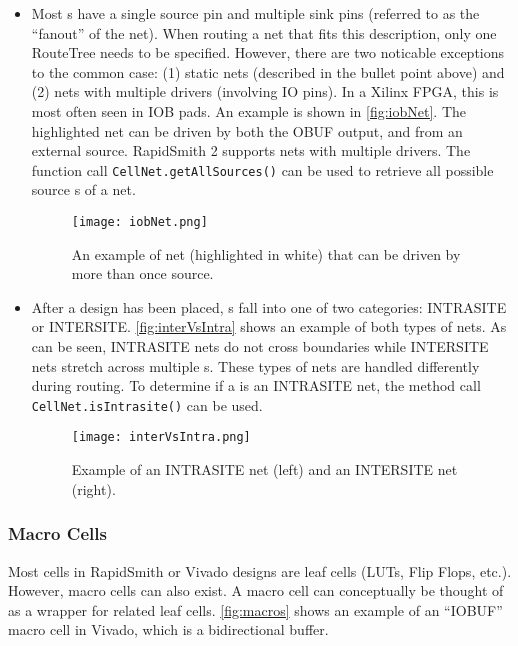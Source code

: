 \begin{itemize}
  \item Most s have a single source pin and multiple sink pins
  (referred to as the ``fanout'' of the net). When routing a net that fits
  this description, only one RouteTree needs to be specified. However, there are
  two noticable exceptions to the common case: (1) static nets (described
  in the bullet point above) and (2) nets with multiple drivers (involving IO
  pins). In a Xilinx FPGA, this is most often seen in IOB pads. An example is
  shown in \autoref{fig:iobNet}. The highlighted net can be driven by both the OBUF output, and from an
  external source. RapidSmith 2 supports nets with multiple drivers. The
  function call \texttt{CellNet.getAllSources()} can be used to retrieve all
  possible source s of a net.
  
  \begin{figure}[H]
   \centering
   \texttt{[image: iobNet.png]}
   \caption{An example of net (highlighted in white) that can be driven by more
   than once source.}
   \label{fig:iobNet}
  \end{figure}
  
  \item After a design has been placed, s fall into one of two
  categories: INTRASITE or INTERSITE. \autoref{fig:interVsIntra} shows an
  example of both types of nets. As can be seen, INTRASITE nets do not cross
   boundaries while INTERSITE nets stretch across multiple
  s. These types of nets are handled differently during routing. To
  determine if a  is an INTRASITE net, the method call
  \texttt{CellNet.isIntrasite()} can be used.
  
  \begin{figure}[H]
   \centering
   \texttt{[image: interVsIntra.png]}
   \caption{Example of an INTRASITE net (left) and an INTERSITE net (right).}
   \label{fig:interVsIntra}
  \end{figure}
  
\end{itemize}

\subsubsection{Macro Cells} \label{sec:macros}
Most cells in RapidSmith or Vivado designs are leaf cells (LUTs, Flip Flops,
etc.). However, macro cells can also exist. A macro cell can conceptually be
thought of as a wrapper for related leaf cells. \autoref{fig:macros} shows an
example of an ``IOBUF'' macro cell in Vivado, which is a bidirectional buffer.

